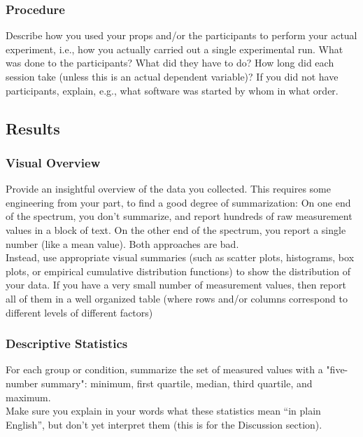 \documentclass[unicode,11pt,a4paper,oneside,numbers=endperiod,openany]{scrartcl}
\begin{document}
    \subsubsection{Procedure}
    Describe how you used your props and/or the participants to perform your actual experiment, i.e., how you actually carried out a single experimental run. What was done to the participants? What did they have to do? How long did each session take (unless this is an actual dependent variable)? If you did not have participants, explain, e.g., what software was started by whom in what order.



\subsection{Results}

    \subsubsection{Visual Overview}

    Provide an insightful overview of the data you collected. This requires some engineering from your part, to find a good degree of summarization: On one end of the spectrum, you don't summarize, and report hundreds of raw measurement values in a block of text. On the other end of the spectrum, you report a single number (like a mean value). Both approaches are bad.\\

    Instead, use appropriate visual summaries (such as scatter plots, histograms, box plots, or empirical cumulative distribution functions) to show the distribution of your data. If you have a very small number of measurement values, then report all of them in a well organized table (where rows and/or columns correspond to different levels of different factors)


    \subsubsection{Descriptive Statistics}

    For each group or condition, summarize the set of measured values with a "five-number summary": minimum, first quartile, median, third quartile, and maximum.\\
    
    Make sure you explain in your words what these statistics mean “in plain English”, but don't yet interpret them (this is for the Discussion section).
\end{document}
